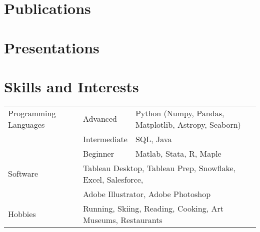 \documentclass[a4paper,12pt]{article}
\begin{document}
\section{Publications}
\begin{refsection}
\nocite{*}
\printbibliography[heading=none]
\end{refsection}

\section{Presentations}

\section{Skills and Interests}
\begin{tabularx}{\linewidth}{@{}l l X@{}}
Programming Languages & Advanced & \normalsize{Python (Numpy, Pandas, Matplotlib, Astropy, Seaborn)}\\
 & Intermediate & \normalsize{SQL, Java}\\
 & Beginner & \normalsize{Matlab, Stata, R, Maple}\\
Software & \multicolumn{2}{l}{\normalsize{Tableau Desktop, Tableau Prep, Snowflake, Excel, Salesforce, }}\\
& \multicolumn{2}{l}{\normalsize{Adobe Illustrator, Adobe Photoshop}}\\
Hobbies & \multicolumn{2}{l}{\normalsize{Running, Skiing, Reading, Cooking, Art Museums, Restaurants}}\\

\end{tabularx}

\vfill
{}
\end{document}
